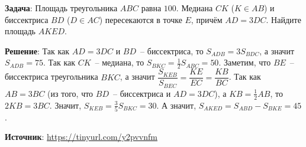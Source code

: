 \documentclass{article} %
\begin{document}
\textbf{Задача}: Площадь треугольника $ABC$ равна $100$. Медиана $CK$ ($K \in AB$) и биссектриса $BD$ ($D \in AC$) пересекаются в точке $E$, причём $AD=3DC$. Найдите площадь $AKED$.  

\begin{center}
\end{center}

\clearpage

\textbf{Решение}: Так как $AD=3DC$ и $BD$~-- биссектриса, то $S_{ADB} = 3S_{BDC}$, а значит $S_{ADB} = 75$. Так как $CK$~-- медиана, то $S_{BKC} = \frac{1}{2} S_{ABC} = 50$. Заметим, что $BE$~-- биссектриса треугольника $BKC$, а значит $\dfrac{S_{KEB}}{S_{BEC}} = \dfrac{KE}{EC} = \dfrac{KB}{BC}$. Так как $AB=3BC$ (из того, что $BD$~-- биссектриса и $AD=3DC$), а $KB=\frac{1}{2}AB$, то $2KB=3BC$. Значит, $S_{KEB} = \frac{3}{5} S_{BKC} = 30$. А значит, $S_{AKED} = S_{ABD}-S_{BKE}=45$.

\textbf{Источник}: \url{https://tinyurl.com/y2pvvnfm} 
\end{document}
